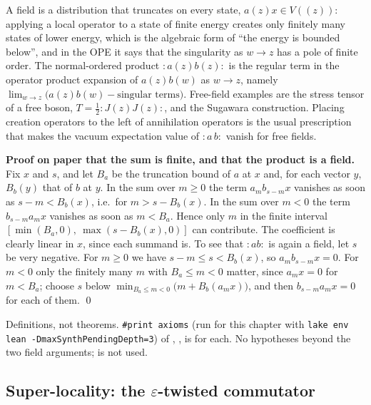 \begin{physics}
A field is a distribution that truncates on every state, $a(z)x\in V((z))$: applying a local operator to a state of
finite energy creates only finitely many states of lower energy, which is the algebraic form of ``the energy is
bounded below'', and in the OPE it says that the singularity as $w\to z$ has a pole of finite order. The
normal-ordered product ${:}a(z)b(z){:}$ is the regular term in the operator product expansion of $a(z)b(w)$ as
$w\to z$, namely $\lim_{w\to z}\big(a(z)b(w)-\text{singular terms}\big)$. Free-field examples are the stress
tensor of a free boson, $T = \tfrac12{:}J(z)J(z){:}$, and the Sugawara construction. Placing creation operators to
the left of annihilation operators is the usual prescription that makes the vacuum expectation value of
${:}a\,b{:}$ vanish for free fields.
\end{physics}

\textbf{Proof on paper that the sum is finite, and that the product is a field.} Fix $x$ and $s$, and let $B_a$ be the
truncation bound of $a$ at $x$ and, for each vector $y$, $B_b(y)$ that of $b$ at $y$. In the sum over $m\ge0$ the term
$a_mb_{s-m}x$ vanishes as soon as $s-m<B_b(x)$, i.e.\ for $m>s-B_b(x)$. In the sum over $m<0$ the term
$b_{s-m}a_mx$ vanishes as soon as $m<B_a$. Hence only $m$ in the finite interval
$[\min(B_a,0),\ \max(s-B_b(x),0)]$ can contribute. The coefficient is clearly linear in $x$, since each summand is.
To see that ${:}ab{:}$ is again a field, let $s$ be very negative. For $m\ge0$ we have $s-m\le s<B_b(x)$, so
$a_mb_{s-m}x = 0$. For $m<0$ only the finitely many $m$ with $B_a\le m<0$ matter, since $a_mx=0$ for $m<B_a$;
choose $s$ below $\min_{B_a\le m<0}\big(m+B_b(a_mx)\big)$, and then $b_{s-m}a_mx = 0$ for each of them. \qed

\begin{status}
Definitions, not theorems. \texttt{\#print axioms} (run for this chapter with
\texttt{lake env lean -DmaxSynthPendingDepth=3}) of , ,  is
\lean{[propext, Classical.}\allowbreak{}\allowbreak\lean{sound]} for each. No hypotheses beyond the
two field arguments;  is not used.
\end{status}

\subsection{Super-locality: the \texorpdfstring{$\varepsilon$}{epsilon}-twisted commutator}\label{l01:sec:super}

